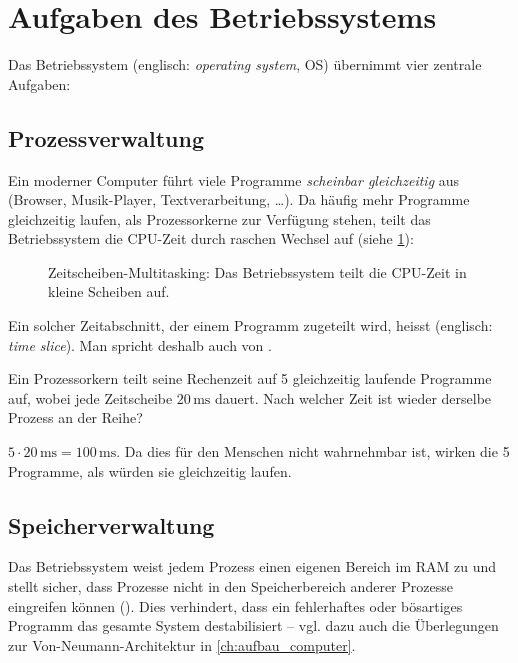 \section{Aufgaben des Betriebssystems}

Das Betriebssystem (englisch: \emph{operating system}, OS) übernimmt vier zentrale Aufgaben:

\subsection{Prozessverwaltung}

Ein moderner Computer führt viele Programme \emph{scheinbar gleichzeitig} aus (Browser, Musik-Player, Textverarbeitung, \ldots). Da häufig mehr Programme gleichzeitig laufen, als Prozessorkerne zur Verfügung stehen, teilt das Betriebssystem die \gls{CPU}-Zeit durch raschen Wechsel auf (siehe \cref{fig:multitasking}):

\begin{figure}[H]
    \centering
    
    \caption{Zeitscheiben-Multitasking: Das Betriebssystem teilt die CPU-Zeit in kleine Scheiben auf.}
    \label{fig:multitasking}
\end{figure}

Ein solcher Zeitabschnitt, der einem Programm zugeteilt wird, heisst  (englisch: \emph{time slice}). Man spricht deshalb auch von .

\begin{myexercise}
    Ein Prozessorkern teilt seine Rechenzeit auf 5 gleichzeitig laufende Programme auf, wobei jede Zeitscheibe $20\,\mathrm{ms}$ dauert. Nach welcher Zeit ist wieder derselbe Prozess an der Reihe?
    \begin{myanswer}
        $5 \cdot 20\,\mathrm{ms} = 100\,\mathrm{ms}$. Da dies für den Menschen nicht wahrnehmbar ist, wirken die 5 Programme, als würden sie gleichzeitig laufen.
    \end{myanswer}
\end{myexercise}

\subsection{Speicherverwaltung}

Das Betriebssystem weist jedem Prozess einen eigenen Bereich im \gls{RAM} zu und stellt sicher, dass Prozesse nicht in den Speicherbereich anderer Prozesse eingreifen können (). Dies verhindert, dass ein fehlerhaftes oder bösartiges Programm das gesamte System destabilisiert -- vgl. dazu auch die Überlegungen zur Von-Neumann-Architektur in \cref{ch:aufbau_computer}.

